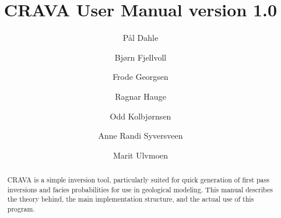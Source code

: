 \documentclass[screen,note,long,backref,indentpar]{nrdoc}
\title{CRAVA User Manual version 1.0}
\author{P{\aa}l Dahle\and Bj{\o}rn Fjellvoll \and Frode Georgsen\and Ragnar Hauge\and Odd Kolbj{\o}rnsen\and Anne Randi Syversveen\and Marit Ulvmoen}
\begin{document}
\maketitle

\begin{abstract}
CRAVA is a simple inversion tool, particularly suited for quick generation of first pass inversions and facies probabilities for use in geological modeling. This manual describes the theory behind, the main implementation structure, and the actual use of this program.
\end{abstract}

\tableofcontents
\clearemptydoublepage



\newpage

\newpage

\newpage



\appendix







\end{document}
